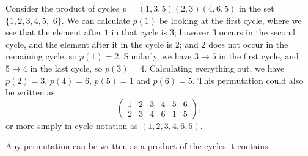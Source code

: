 \begin{example}
  Consider the product of cycles $p = (1, 3, 5)(2, 3)(4, 6, 5)$ in the set
  $\{1, 2, 3, 4, 5,$ $6\}$.  We can calculate $p(1)$ be looking at the first
  cycle, where we see that the element after $1$ in that cycle is $3$; however
  $3$ occurs in the second cycle, and the element after it in the cycle is $2$;
  and $2$ does not occur in the remaining cycle, so $p(1) = 2$.  Similarly,
  we have $3 \to 5$ in the first cycle, and $5 \to 4$ in the last cycle, so
  $p(3) = 4$.
  Calculating everything out, we have $p(2) = 3$, $p(4) = 6$, $p(5) = 1$ and
  $p(6) = 5$.  This permutation could also be written as
  \[
    \begin{pmatrix}
      1 & 2 & 3 & 4 & 5 & 6\\
      2 & 3 & 4 & 6 & 1 & 5
    \end{pmatrix},
  \]
  or more simply in cycle notation as $(1, 2, 3, 4, 6, 5)$.
\end{example}

Any permutation can be written as a product of the cycles it contains.


